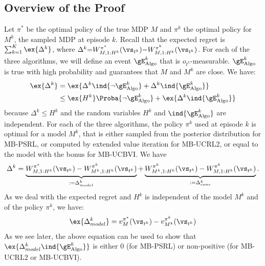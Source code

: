 \begin{subappendices}
\subsection{Overview of the Proof}
\label{ssec:overview}

Let $\pi^*$ be the optimal policy of the true MDP $M$ and $\pi^k$ the optimal policy for $M^k$, the sampled MDP at episode $k$. Recall that the expected regret is $\sum_{k=1}^K \ex{\Delta^k}$, where $\Delta^k {=} W_{M,1:H^k}^{\pi^*}(\vs_{t^k}) {-} W_{M,1:H^k}^{\pi^k}(\vs_{t^k})$.
For each of the three algorithms, we will define an event $\gE_\text{Algo}^{k}$ that is $o_{t^k}$-measurable. $\gE_\text{Algo}^{k}$ is true with high probability and guarantees that $M$ and $M^k$ are close.
We have:
\begin{align}
    \ex{\Delta^k}
    &= \ex{\Delta^k\ind{\lnot\gE_\text{Algo}^{k}} +\Delta^k\ind{\gE^{k}_\text{Algo}} } \nonumber\\
    &\le \ex{H^k}\Proba{\lnot\gE^{k}_\text{Algo}} + \ex{\Delta^k \ind{\gE^{k}_\text{Algo}}} \label{eq:gap_overview}
\end{align}
because $\Delta^k\le H^k$ and the random variables $H^k$ and $\ind{\gE^{k}_\text{Algo}}$ are independent.
For each of the three algorithms, the policy $\pi^k$ used at episode $k$ is optimal for a model $M^k$, that is either sampled from the posterior distribution for MB-PSRL, or computed by extended value iteration for MB-UCRL2, or equal to the model with the bonus for MB-UCBVI. We have
\begin{align*}
    \Delta^k=\underbrace{W_{M,1:H^k}^{\pi^*}(\vs_{t^k}) - W_{M^k,1:H^k}^{\pi^k}(\vs_{t^k})}_{:=\Delta_{model}^k}%
    + \underbrace{W_{M^k,1:H^k}^{\pi^k}(\vs_{t^k}) - W_{M,1:H^k}^{\pi^k}(\vs_{t^k})}_{:=\Delta_{conc}^k}.
\end{align*}
As we deal with the expected regret and $H^k$ is independent of the model $M^k$ and of the policy $\pi^k$, we have:
\begin{align}
    \ex{\Delta_{model}^k} = v_{M}^{\pi^*}(\vs_{t^k}) - v_{M^k}^{\pi^k}(\vs_{t^k}) \label{eq:def_model}
\end{align}
As we see later, the above equation can be used to show that $\ex{\Delta_{model}^k \ind{\gE^{k}_\text{Algo}}}$ is either $0$ (for MB-PSRL) or non-positive (for MB-UCRL2 or MB-UCBVI). 


\end{subappendices}
